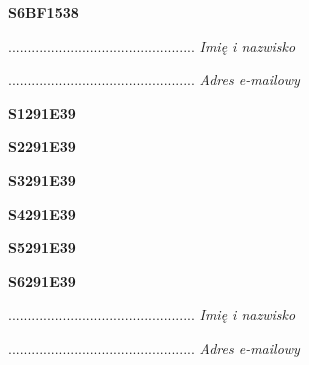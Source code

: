 \begin{turn}{90}\huge \textbf{S6BF1538}\end{turn}

\begin{turn}{90}\begin{minipage}{\linewidth} \vspace{20mm} ................................................  \textit{Imię i nazwisko}\end{minipage}\end{turn}

\begin{turn}{90}\begin{minipage}{\linewidth} \vspace{20mm} ................................................  \textit{Adres e-mailowy}\end{minipage}\end{turn}

\begin{turn}{90}\huge \textbf{S1291E39}\end{turn}

\begin{turn}{90}\huge \textbf{S2291E39}\end{turn}

\begin{turn}{90}\huge \textbf{S3291E39}\end{turn}

\begin{turn}{90}\huge \textbf{S4291E39}\end{turn}

\begin{turn}{90}\huge \textbf{S5291E39}\end{turn}

\begin{turn}{90}\huge \textbf{S6291E39}\end{turn}

\begin{turn}{90}\begin{minipage}{\linewidth} \vspace{20mm} ................................................  \textit{Imię i nazwisko}\end{minipage}\end{turn}

\begin{turn}{90}\begin{minipage}{\linewidth} \vspace{20mm} ................................................  \textit{Adres e-mailowy}\end{minipage}\end{turn}

